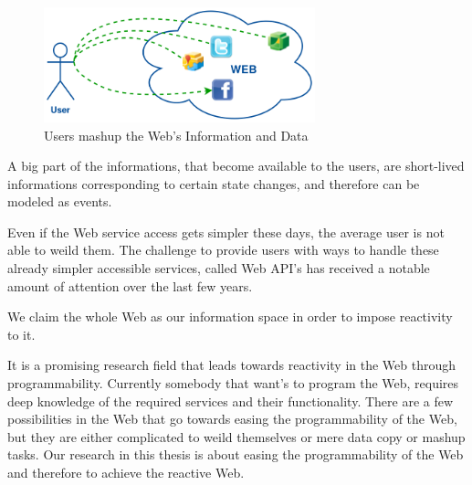 \begin{figure}[!ht]
  \centering
  \includegraphics[width=0.7\textwidth]{figures/UsersWeildServicesInTheWeb}
  \caption{Users mashup the Web's Information and Data}
  \label{fig:UsersWeildServicesInTheWeb}
\end{figure}

A big part of the informations, that become available to the users, are short-lived informations corresponding to certain state changes, and therefore can be modeled as events.


Even if the Web service access gets simpler these days, the average user is not able to weild them.
The challenge to provide users with ways to handle these already simpler accessible services, called Web API's has received a notable amount of attention over the last few years.

We claim the whole Web as our information space in order to impose reactivity to it.




It is a promising research field that leads towards reactivity in the Web through programmability.
Currently somebody that want's to program the Web, requires deep knowledge of the required services and their functionality.
There are a few possibilities in the Web that go towards easing the programmability of the Web, but they are either complicated to weild themselves or mere data copy or mashup tasks.
Our research in this thesis is about easing the programmability of the Web and therefore to achieve the reactive Web. 
